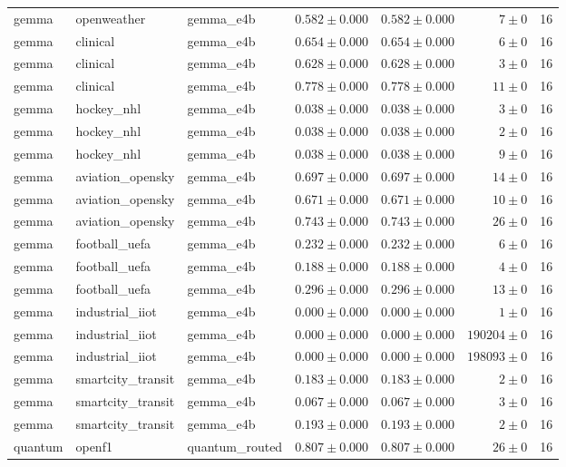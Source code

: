 \begin{table}[htbp]
\begin{tabular}{l l l r r r r}
gemma & openweather & gemma\_e4b & $0.582\pm0.000$ & $0.582\pm0.000$ & $7\pm0$ & 16 \\
gemma & clinical & gemma\_e4b & $0.654\pm0.000$ & $0.654\pm0.000$ & $6\pm0$ & 16 \\
gemma & clinical & gemma\_e4b & $0.628\pm0.000$ & $0.628\pm0.000$ & $3\pm0$ & 16 \\
gemma & clinical & gemma\_e4b & $0.778\pm0.000$ & $0.778\pm0.000$ & $11\pm0$ & 16 \\
gemma & hockey\_nhl & gemma\_e4b & $0.038\pm0.000$ & $0.038\pm0.000$ & $3\pm0$ & 16 \\
gemma & hockey\_nhl & gemma\_e4b & $0.038\pm0.000$ & $0.038\pm0.000$ & $2\pm0$ & 16 \\
gemma & hockey\_nhl & gemma\_e4b & $0.038\pm0.000$ & $0.038\pm0.000$ & $9\pm0$ & 16 \\
gemma & aviation\_opensky & gemma\_e4b & $0.697\pm0.000$ & $0.697\pm0.000$ & $14\pm0$ & 16 \\
gemma & aviation\_opensky & gemma\_e4b & $0.671\pm0.000$ & $0.671\pm0.000$ & $10\pm0$ & 16 \\
gemma & aviation\_opensky & gemma\_e4b & $0.743\pm0.000$ & $0.743\pm0.000$ & $26\pm0$ & 16 \\
gemma & football\_uefa & gemma\_e4b & $0.232\pm0.000$ & $0.232\pm0.000$ & $6\pm0$ & 16 \\
gemma & football\_uefa & gemma\_e4b & $0.188\pm0.000$ & $0.188\pm0.000$ & $4\pm0$ & 16 \\
gemma & football\_uefa & gemma\_e4b & $0.296\pm0.000$ & $0.296\pm0.000$ & $13\pm0$ & 16 \\
gemma & industrial\_iiot & gemma\_e4b & $0.000\pm0.000$ & $0.000\pm0.000$ & $1\pm0$ & 16 \\
gemma & industrial\_iiot & gemma\_e4b & $0.000\pm0.000$ & $0.000\pm0.000$ & $190204\pm0$ & 16 \\
gemma & industrial\_iiot & gemma\_e4b & $0.000\pm0.000$ & $0.000\pm0.000$ & $198093\pm0$ & 16 \\
gemma & smartcity\_transit & gemma\_e4b & $0.183\pm0.000$ & $0.183\pm0.000$ & $2\pm0$ & 16 \\
gemma & smartcity\_transit & gemma\_e4b & $0.067\pm0.000$ & $0.067\pm0.000$ & $3\pm0$ & 16 \\
gemma & smartcity\_transit & gemma\_e4b & $0.193\pm0.000$ & $0.193\pm0.000$ & $2\pm0$ & 16 \\
quantum & openf1 & quantum\_routed & $0.807\pm0.000$ & $0.807\pm0.000$ & $26\pm0$ & 16 \\

\end{tabular}
\end{table}

